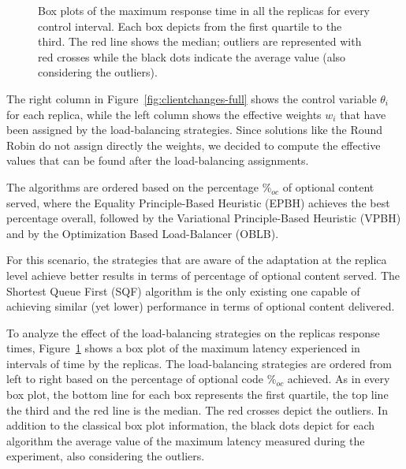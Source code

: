 \begin{figure}
\centering 
  \vspace{-4mm}
\caption{Box plots of the maximum response time in all the replicas
  for every control interval. Each box depicts from the first quartile
  to the third. The red line shows the median; outliers are
  represented with red crosses while the black dots indicate the
  average value (also considering the outliers).}
  \vspace{-2mm}
\label{fig:clientchanges-boxplot}
\end{figure}

The right column in Figure~\ref{fig:clientchanges-full} shows the
control variable $\theta_i$ for each replica, while the left column
shows the effective weights $w_i$ that have been assigned by the
load-balancing strategies. Since solutions like the Round Robin do not
assign directly the weights, we decided to compute the effective
values that can be found after the load-balancing assignments. 

The algorithms are ordered based on the percentage $\%_{oc}$ of optional
content served, where the Equality Principle-Based Heuristic (EPBH)
achieves the best percentage overall, followed by the Variational
Principle-Based Heuristic (VPBH) and by the Optimization Based
Load-Balancer (OBLB).

For this scenario, the strategies that are aware of the adaptation at
the replica level achieve better results in terms of percentage of
optional content served. The Shortest Queue First (SQF) algorithm is
the only existing one capable of achieving similar (yet lower)
performance in terms of optional content delivered.

To analyze the effect of the load-balancing strategies on the replicas
response times, Figure~\ref{fig:clientchanges-boxplot} shows a box
plot of the maximum latency experienced in intervals of time by the
replicas. The load-balancing strategies are ordered from left to right
based on the percentage of optional code $\%_{oc}$ achieved. As in
every box plot, the bottom line for each box represents the first
quartile, the top line the third and the red line is the median. The
red crosses depict the outliers. In addition to the classical box plot
information, the black dots depict for each algorithm the average
value of the maximum latency measured during the experiment, also
considering the outliers.

